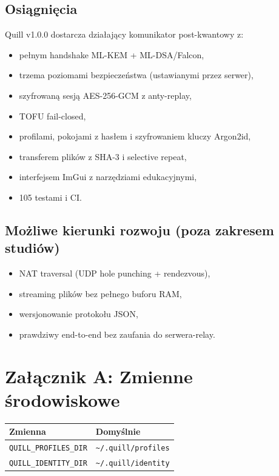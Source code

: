 \documentclass[12pt,a4paper]{article}
\begin{document}
\subsection{Osiągnięcia}

Quill v1.0.0 dostarcza działający komunikator post-kwantowy z:
\begin{itemize}
    \item pełnym handshake ML-KEM + ML-DSA/Falcon,
    \item trzema poziomami bezpieczeństwa (ustawianymi przez serwer),
    \item szyfrowaną sesją AES-256-GCM z anty-replay,
    \item TOFU fail-closed,
    \item profilami, pokojami z hasłem i szyfrowaniem kluczy Argon2id,
    \item transferem plików z SHA-3 i selective repeat,
    \item interfejsem ImGui z narzędziami edukacyjnymi,
    \item 105 testami i CI.
\end{itemize}

\subsection{Możliwe kierunki rozwoju (poza zakresem studiów)}

\begin{itemize}
    \item NAT traversal (UDP hole punching + rendezvous),
    \item streaming plików bez pełnego buforu RAM,
    \item wersjonowanie protokołu JSON,
    \item prawdziwy end-to-end bez zaufania do serwera-relay.
\end{itemize}

\appendix
\section{Załącznik A: Zmienne środowiskowe}

\begin{table}[H]
\centering
\begin{tabular}{@{}ll@{}}
\toprule
\textbf{Zmienna} & \textbf{Domyślnie} \\
\midrule
\texttt{QUILL\_PROFILES\_DIR} & \texttt{\textasciitilde/.quill/profiles} \\
\texttt{QUILL\_IDENTITY\_DIR} & \texttt{\textasciitilde/.quill/identity} \\
\bottomrule
\end{tabular}
\end{table}
\end{document}
